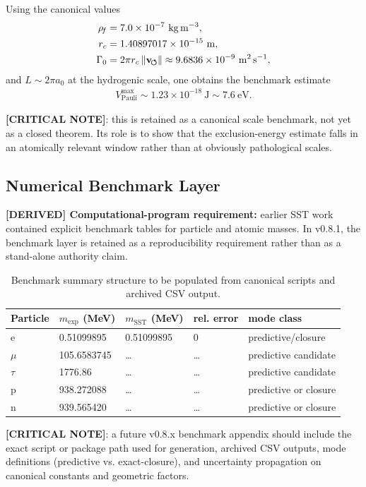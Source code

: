 Using the canonical values
\begin{align}
    \rhoF &= 7.0\times 10^{-7}\ \mathrm{kg\,m^{-3}}, \\
    \rc &= 1.40897017\times 10^{-15}\ \mathrm{m}, \\
    \Gamma_0 &= 2\pi \rc\,\vnorm \approx 9.6836\times 10^{-9}\ \mathrm{m^2\,s^{-1}},
\end{align}
and $L\sim 2\pi a_0$ at the hydrogenic scale, one obtains the benchmark estimate
\begin{align}
    V_{\mathrm{Pauli}}^{\max} \sim 1.23\times 10^{-18}\ \mathrm{J} \sim 7.6\ \mathrm{eV}.
\end{align}

\textbf{[CRITICAL NOTE]}: this is retained as a canonical scale benchmark, not yet as a closed theorem. Its role is to show that the exclusion-energy estimate falls in an atomically relevant window rather than at obviously pathological scales.

\subsection{Numerical Benchmark Layer}
\textbf{[DERIVED] Computational-program requirement:} earlier SST work contained explicit benchmark tables for particle and atomic masses. In v0.8.1, the benchmark layer is retained as a reproducibility requirement rather than as a stand-alone authority claim.

\begin{table}[h]
\centering
\begin{tabular}{lllll}
\hline
Particle & $m_{\mathrm{exp}}$ (MeV) & $m_{\mathrm{SST}}$ (MeV) & rel. error & mode class \\
\hline
e & 0.51099895 & 0.51099895 & 0 & predictive/closure \\
$\mu$ & 105.6583745 & \dots & \dots & predictive candidate \\
$\tau$ & 1776.86 & \dots & \dots & predictive candidate \\
p & 938.272088 & \dots & \dots & predictive or closure \\
n & 939.565420 & \dots & \dots & predictive or closure \\
\hline
\end{tabular}
\caption{Benchmark summary structure to be populated from canonical scripts and archived CSV output.}
\end{table}

\textbf{[CRITICAL NOTE]}: a future v0.8.x benchmark appendix should include the exact script or package path used for generation, archived CSV outputs, mode definitions (predictive vs. exact-closure), and uncertainty propagation on canonical constants and geometric factors.

